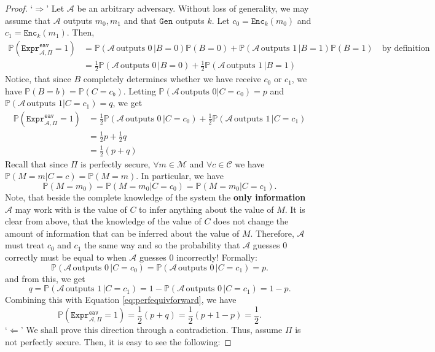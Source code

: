 \documentclass{article}
\theoremstyle{definition}
\theoremstyle{example}
\newcommand{\Enc}{\texttt{Enc}}
\newcommand{\Gen}{\texttt{Gen}}
\newcommand{\M}{\mathcal{M}}
\renewcommand{\C}{\mathcal{C}}
\newcommand{\A}{\mathcal{A}}
\newcommand{\Prob}{\mathbb{P}}
\newcommand{\Expr}[2]{\texttt{Expr}^{\texttt{#1}}_{#2}}
\begin{document}
\begin{proof}
  `$\Rightarrow$' Let $\A$ be an arbitrary adversary. Without loss
  of generality, we may assume that $\A$ outputs $m_0, m_1$ and that $\Gen$
  outputs $k$. Let $c_0 = \Enc_k(m_0)$ and $c_1 = \Enc_k(m_1)$. Then,
  \begin{align*}
    \Prob(\Expr{eav}{\A, \Pi} = 1) &= \Prob(\A \,\text{outputs 0}\,| B = 0)\Prob(B = 0) + \Prob(\A \,\text{outputs 1}\,| B = 1)\Prob(B = 1) \quad\text{by definition}\\
    &= \frac12\Prob(\A \,\text{outputs 0}\,| B = 0) + \frac12\Prob(\A \,\text{outputs 1}\,| B = 1)
  \end{align*}
  Notice, that since $B$ completely determines whether we have receive $c_0$ or
  $c_1$, we have $\Prob(B = b) = \Prob(C = c_b)$. Letting
  $\Prob(\A\,\text{outputs 0} | C = c_0) = p$ and $\Prob(\A\,\text{outputs 1} |
  C = c_1) = q$, we get
  \begin{equation}
    \begin{split}
    \label{eq:perfequivforward}
    \Prob(\Expr{eav}{\A, \Pi} = 1) &= \frac12 \Prob(\A \, \text{outputs 0} \,| C = c_0) + \frac12 \Prob(\A \,\text{outputs 1}\,| C = c_1) \\
                                   &= \frac12 p + \frac12 q \\
                                   &=  \frac12 (p + q)
    \end{split}
  \end{equation}
  Recall that since $\Pi$ is perfectly secure, $\forall m \in \M$ and $\forall c
  \in \C$ we have $\Prob(M = m | C = c) = \Prob(M = m)$. In particular, we have
  \[
    \Prob(M = m_0) = \Prob(M = m_0 | C = c_0) = \Prob(M = m_0 | C = c_1).
  \]
  Note, that beside the complete knowledge of the system the \textbf{only information} $\A$
  may work with is the value of $C$ to infer anything about the value of $M$.
  It is clear from above, that the knowledge of the value of $C$ does not change
  the amount of information that can be inferred about the value of $M$.
  Therefore, $\A$ must treat $c_0$ and $c_1$ the same way and so the probability that $\A$ guesses $0$ correctly must be equal to when $\A$ guesses
  $0$ incorrectly! Formally:
  \[
    \Prob(\A \, \text{outputs 0} \,| C = c_0) = \Prob(\A \,
    \text{outputs 0} \,| C = c_1) = p.
  \]
  and from this, we get
  \[
  q = \Prob(\A \, \text{outputs 1} \,| C = c_1) =
  1 - \Prob(\A \, \text{outputs 0} \,| C = c_1) = 1 - p.
  \]
  Combining this with Equation \ref{eq:perfequivforward}, we have
  \[
    \Prob(\Expr{eav}{\A, \Pi} = 1) = \frac12 (p + q) = \frac12 (p + 1 - p) = \frac12.
  \]
  `$\Leftarrow$' We shall prove this direction through a contradiction. Thus,
  assume $\Pi$ is not perfectly secure. Then, it is easy to see the following:

\end{proof}
\end{document}
